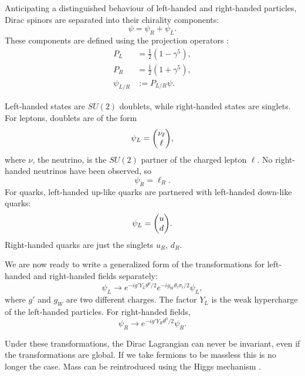 Anticipating a distinguished behaviour of left-handed and right-handed particles, Dirac spinors are separated into their chirality components:
\begin{equation}
    \psi = \psi_R+\psi_L.
\end{equation}
These components are defined using the projection operators \cite{kane_modern_1987}:
\begin{align}
    P_L &= \frac{1}{2}(1-\gamma^5), \\
    P_R &= \frac{1}{2}(1+\gamma^5), \\
    \psi_{L/R} &:= P_{L/R} \psi.
\end{align}

Left-handed states are $SU(2)$ doublets, while right-handed states are singlets. For leptons, doublets are of the form
\begin{equation}
    \psi_L = \mqty( \nu_\ell \\ \ell ),
\end{equation}
where $\nu$, the neutrino, is the $SU(2)$ partner of the charged lepton $\ell$. No right-handed neutrinos have been observed, so 
\begin{equation}
    \psi_R = \ell_R.
\end{equation}
For quarks, left-handed up-like quarks are partnered with left-handed down-like quarks:
\begin{equation}
    \psi_L = \mqty( u \\ d ).
\end{equation}
Right-handed quarks are just the singlets $u_R$, $d_R$.

We are now ready to write a generalized form of the transformations for left-handed and right-handed fields separately:
\begin{equation}
    \psi_L \rightarrow e^{-ig'Y_L\theta^0/2}e^{-ig_W\theta_i\sigma_i/2}\psi_L,
\end{equation}
where $g'$ and $g_W$ are two different charges. The factor $Y_L$ is the weak hypercharge of the left-handed particles. For right-handed fields,
\begin{equation}
    \psi_R \rightarrow e^{-ig'Y_R\theta^0/2}\psi_R.
\end{equation}

Under these transformations, the Dirac Lagrangian can never be invariant, even if the transformations are global. If we take fermions to be massless this is no longer the case. Mass can be reintroduced using the Higgs mechanism \cite{goldberg_standard_2017}.

